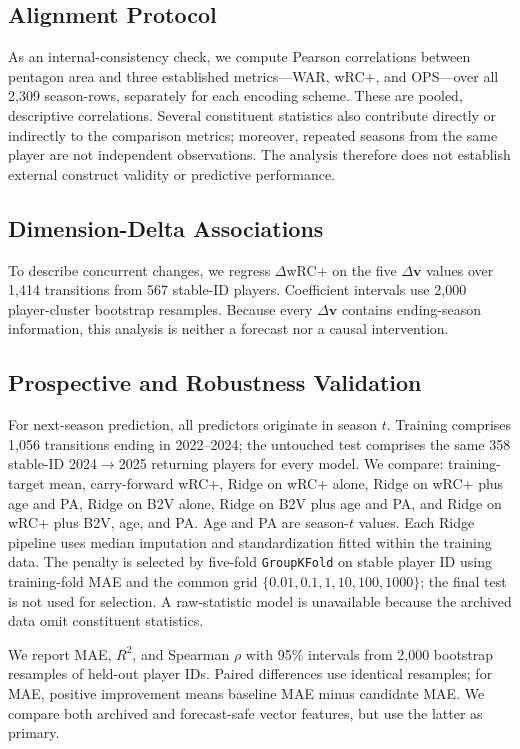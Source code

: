 \documentclass[10pt,twocolumn,letterpaper]{article}
\begin{document}
\subsection{Alignment Protocol}
As an internal-consistency check, we compute Pearson correlations between pentagon area and three established metrics---WAR, wRC+, and OPS---over all 2{,}309 season-rows, separately for each encoding scheme. These are pooled, descriptive correlations. Several constituent statistics also contribute directly or indirectly to the comparison metrics; moreover, repeated seasons from the same player are not independent observations. The analysis therefore does not establish external construct validity or predictive performance.

\subsection{Dimension-Delta Associations}
\label{sec:delta-method}
To describe concurrent changes, we regress $\Delta$wRC+ on the five $\Delta\mathbf{v}$ values over 1{,}414 transitions from 567 stable-ID players. Coefficient intervals use 2{,}000 player-cluster bootstrap resamples. Because every $\Delta\mathbf{v}$ contains ending-season information, this analysis is neither a forecast nor a causal intervention.

\subsection{Prospective and Robustness Validation}
\label{sec:validation-method}
For next-season prediction, all predictors originate in season $t$. Training comprises 1{,}056 transitions ending in 2022--2024; the untouched test comprises the same 358 stable-ID 2024$\to$2025 returning players for every model. We compare: training-target mean, carry-forward wRC+, Ridge on wRC+ alone, Ridge on wRC+ plus age and PA, Ridge on B2V alone, Ridge on B2V plus age and PA, and Ridge on wRC+ plus B2V, age, and PA. Age and PA are season-$t$ values. Each Ridge pipeline uses median imputation and standardization fitted within the training data. The penalty is selected by five-fold \texttt{GroupKFold} on stable player ID using training-fold MAE and the common grid $\{0.01,0.1,1,10,100,1000\}$; the final test is not used for selection. A raw-statistic model is unavailable because the archived data omit constituent statistics.

We report MAE, $R^2$, and Spearman $\rho$ with 95\% intervals from 2{,}000 bootstrap resamples of held-out player IDs. Paired differences use identical resamples; for MAE, positive improvement means baseline MAE minus candidate MAE. We compare both archived and forecast-safe vector features, but use the latter as primary.
\end{document}
